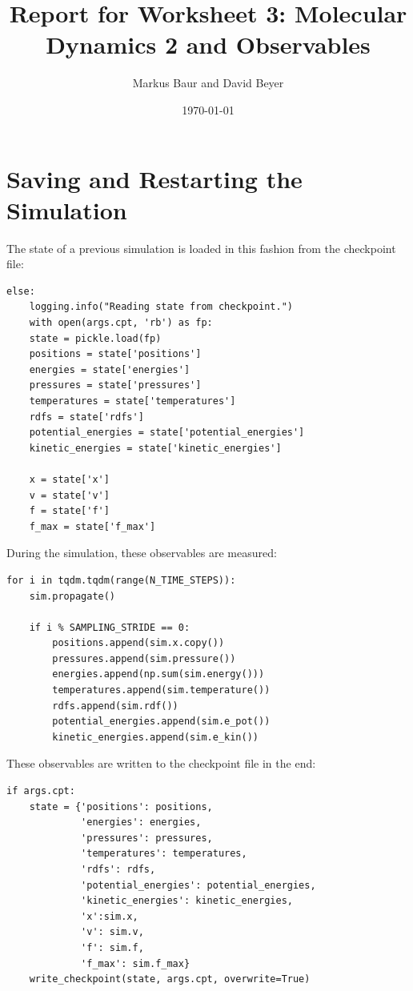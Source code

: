 \documentclass[a4paper,10pt,bibtotoc]{scrartcl}
\begin{document}
\titlehead{Simulation Methods in Physics I \hfill WS 2019/2010}
\title{Report for Worksheet 3: Molecular Dynamics 2 and Observables}
\author{Markus Baur and David Beyer}
\date{\today}
\maketitle

\tableofcontents
\newpage

\section{Saving and Restarting the Simulation}
The state of a previous simulation is loaded in this fashion from the checkpoint file:
\begin{lstlisting}
else:
    logging.info("Reading state from checkpoint.")
    with open(args.cpt, 'rb') as fp:
    state = pickle.load(fp)
    positions = state['positions']
    energies = state['energies']
    pressures = state['pressures']
    temperatures = state['temperatures']
    rdfs = state['rdfs']
    potential_energies = state['potential_energies']
    kinetic_energies = state['kinetic_energies']

    x = state['x']
    v = state['v']
    f = state['f']
    f_max = state['f_max']
\end{lstlisting}
During the simulation, these observables are measured:
\begin{lstlisting}
for i in tqdm.tqdm(range(N_TIME_STEPS)):
    sim.propagate()

    if i % SAMPLING_STRIDE == 0:
        positions.append(sim.x.copy())
        pressures.append(sim.pressure())
        energies.append(np.sum(sim.energy()))
        temperatures.append(sim.temperature())
        rdfs.append(sim.rdf())
        potential_energies.append(sim.e_pot())
        kinetic_energies.append(sim.e_kin())
\end{lstlisting}
These observables are written to the checkpoint file in the end:
\begin{lstlisting}
if args.cpt:
    state = {'positions': positions,
             'energies': energies,
             'pressures': pressures,
             'temperatures': temperatures,
             'rdfs': rdfs,
             'potential_energies': potential_energies,
             'kinetic_energies': kinetic_energies,
             'x':sim.x,
             'v': sim.v,
             'f': sim.f,
             'f_max': sim.f_max}
    write_checkpoint(state, args.cpt, overwrite=True)
\end{lstlisting}
\end{document}
